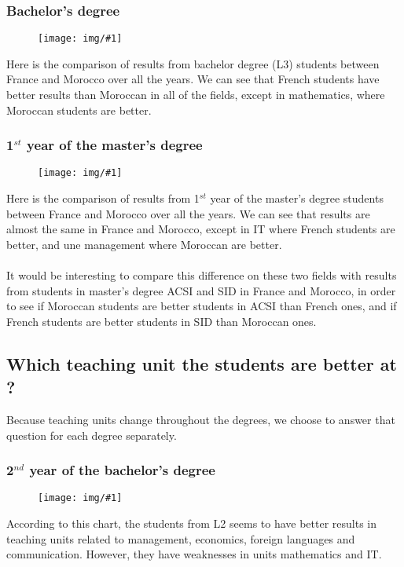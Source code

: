 \documentclass[11pt, a4paper]{article}
\newcommand\image[2]{
	\begin{figure}[H]
	\centering
	\texttt{[image: img/\#1]}
	\end{figure}
}
\begin{document}
    \subsubsection{Bachelor's degree}

   \image{image21.png}{\textwidth}

   Here is the comparison of results from bachelor degree (L3) students between France and Morocco over all the years. We can see that French students have better results than Moroccan in all of the fields, except in mathematics, where Moroccan students are better.

   \subsubsection{1$^{st}$ year of the master's degree}

   \image{image20.png}{\textwidth}

   Here is the comparison of results from 1$^{st}$ year of the master's degree students between France and Morocco over all the years. We can see that results are almost the same in France and Morocco, except in IT where French students are better, and une management where Moroccan are better.
\\\\
It would be interesting to compare this difference on these two fields with results from students in master's degree ACSI and SID in France and Morocco, in order to see if Moroccan students are better students in ACSI than French ones, and if French students are better students in SID than Moroccan ones.
    
    \newpage
    \subsection{Which teaching unit the students are better at ?}

    Because teaching units change throughout the degrees, we choose to answer that question for each degree separately.
    
     \subsubsection{2$^{nd}$ year of the bachelor's degree}
    \image{image06.png}{400px}

    According to this chart, the students from L2 seems to have better results in teaching units related to management, economics, foreign languages and communication. However, they have weaknesses in units mathematics and IT.
\end{document}

